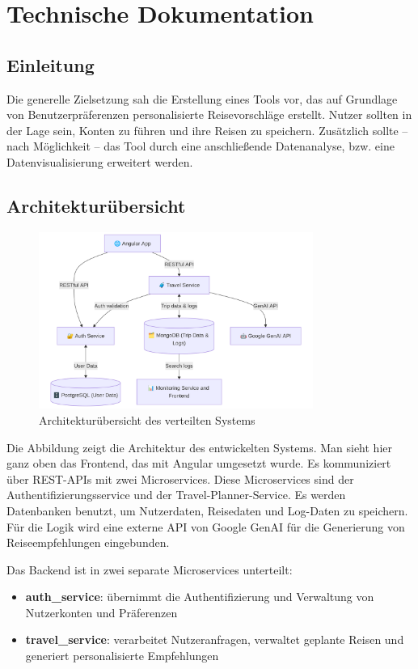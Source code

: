 \section{Technische Dokumentation}

\subsection{Einleitung}

Die generelle Zielsetzung sah die Erstellung eines Tools vor, das auf Grundlage von Benutzerpräferenzen personalisierte Reisevorschläge erstellt. Nutzer sollten in der Lage sein, Konten zu führen und ihre Reisen zu speichern.
Zusätzlich sollte – nach Möglichkeit – das Tool durch eine anschließende Datenanalyse, bzw. eine Datenvisualisierung erweitert werden.  

\subsection{Architekturübersicht}

\begin{figure}[h]
  \centering
  \includegraphics[width=0.8\textwidth]{images/architecture.png}
  \caption{Architekturübersicht des verteilten Systems}
\end{figure}

Die Abbildung zeigt die Architektur des entwickelten Systems. Man sieht hier ganz oben das Frontend, das mit Angular umgesetzt wurde. Es kommuniziert über REST-APIs mit zwei Microservices. Diese Microservices sind der Authentifizierungsservice und der Travel-Planner-Service. Es werden Datenbanken benutzt, um Nutzerdaten, Reisedaten und Log-Daten zu speichern. Für die Logik wird eine externe API von Google GenAI für die Generierung von Reiseempfehlungen eingebunden.

Das Backend ist in zwei separate Microservices unterteilt:
\begin{itemize}
  \item \textbf{auth\_service}: übernimmt die Authentifizierung und Verwaltung von Nutzerkonten und Präferenzen
  \item \textbf{travel\_service}: verarbeitet Nutzeranfragen, verwaltet geplante Reisen und generiert personalisierte Empfehlungen
\end{itemize}

